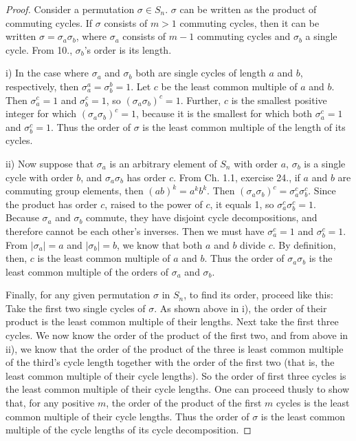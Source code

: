 \documentclass{article}
\begin{document}
\begin{proof}
    Consider a permutation $\sigma \in S_n$. $\sigma$ can be written as the product of commuting cycles. If $\sigma$ consists of $m > 1$ commuting cycles, then it can be written $\sigma = \sigma_a \sigma_b$, where $\sigma_a$ consists of $m - 1$ commuting cycles and $\sigma_b$ a single cycle. From 10., $\sigma_b$'s order is its length.

    i) In the case where $\sigma_a$ and $\sigma_b$ both are single cycles of length $a$ and $b$, respectively, then $\sigma_a^a = \sigma_b^b = 1$. Let $c$ be the least common multiple of $a$ and $b$. Then $\sigma_a^c = 1$ and $\sigma_b^c = 1$, so $(\sigma_a \sigma_b)^c = 1$. Further, $c$ is the smallest positive integer for which $(\sigma_a \sigma_b)^c = 1$, because it is the smallest for which both $\sigma_a^c = 1$ and $\sigma_b^c = 1$. Thus the order of $\sigma$ is the least common multiple of the length of its cycles.
    
    ii) Now suppose that $\sigma_a$ is an arbitrary element of $S_n$ with order $a$, $\sigma_b$ is a single cycle with order $b$, and $\sigma_a \sigma_b$ has order $c$. From Ch. 1.1, exercise 24., if $a$ and $b$ are commuting group elements, then $(ab)^k = a^k b^k$. Then $(\sigma_a \sigma_b)^c = \sigma_a^c \sigma_b^c$. Since the product has order $c$, raised to the power of $c$, it equals 1, so $\sigma_a^c \sigma_b^c = 1$. Because $\sigma_a$ and $\sigma_b$ commute, they have disjoint cycle decompositions, and therefore cannot be each other's inverses. Then we must have $\sigma_a^c = 1$ and $\sigma_b^c = 1$. From $|\sigma_a| = a$ and $|\sigma_b| = b$, we know that both $a$ and $b$ divide $c$. By definition, then, $c$ is the least common multiple of $a$ and $b$. Thus the order of $\sigma_a \sigma_b$ is the least common multiple of the orders of $\sigma_a$ and $\sigma_b$.

    Finally, for any given permutation $\sigma$ in $S_n$, to find its order, proceed like this: Take the first two single cycles of $\sigma$. As shown above in i), the order of their product is the least common multiple of their lengths. Next take the first three cycles. We now know the order of the product of the first two, and from above in ii), we know that the order of the product of the three is least common multiple of the third's cycle length together with the order of the first two (that is, the least common multiple of their cycle lengths). So the order of first three cycles is the least common multiple of their cycle lengths. One can proceed thusly to show that, for any positive $m$, the order of the product of the first $m$ cycles is the least common multiple of their cycle lengths. Thus the order of $\sigma$ is the least common multiple of the cycle lengths of its cycle decomposition.
\end{proof}
\end{document}
